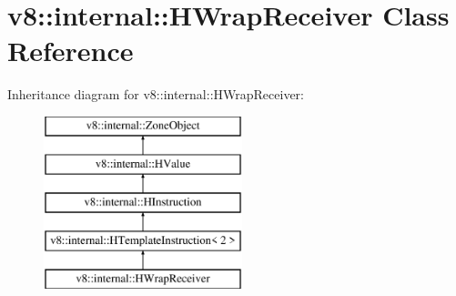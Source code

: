 \hypertarget{classv8_1_1internal_1_1_h_wrap_receiver}{}\section{v8\+:\+:internal\+:\+:H\+Wrap\+Receiver Class Reference}
\label{classv8_1_1internal_1_1_h_wrap_receiver}
Inheritance diagram for v8\+:\+:internal\+:\+:H\+Wrap\+Receiver\+:\begin{figure}[H]
\begin{center}
\leavevmode
\includegraphics[height=5.000000cm]{classv8_1_1internal_1_1_h_wrap_receiver}
\end{center}
\end{figure}
